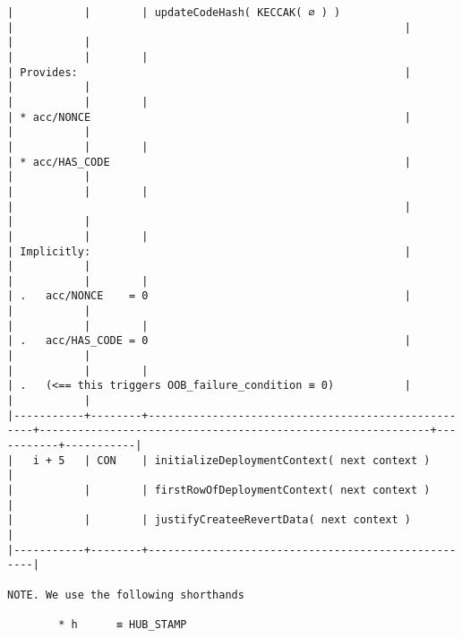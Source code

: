 \documentclass[varwidth=\maxdimen,margin=0.5cm,multi={verbatim}]{standalone}
\begin{document}
\begin{verbatim}
|           |        | updateCodeHash( KECCAK( ∅ ) )                      |                                                             |           |           |
|           |        |                                                    | Provides:                                                   |           |           |
|           |        |                                                    | * acc/NONCE                                                 |           |           |
|           |        |                                                    | * acc/HAS_CODE                                              |           |           |
|           |        |                                                    |                                                             |           |           |
|           |        |                                                    | Implicitly:                                                 |           |           |
|           |        |                                                    | .   acc/NONCE    = 0                                        |           |           |
|           |        |                                                    | .   acc/HAS_CODE = 0                                        |           |           |
|           |        |                                                    | .   (<== this triggers OOB_failure_condition ≡ 0)           |           |           |
|-----------+--------+----------------------------------------------------+-------------------------------------------------------------+-----------+-----------|
|   i + 5   | CON    | initializeDeploymentContext( next context )        |
|           |        | firstRowOfDeploymentContext( next context )        |
|           |        | justifyCreateeRevertData( next context )           |
|-----------+--------+----------------------------------------------------|

NOTE. We use the following shorthands

        * h      ≡ HUB_STAMP

\end{verbatim}
\end{document}
